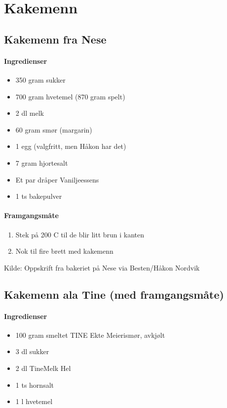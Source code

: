 \section{﻿Kakemenn}

\subsection{Kakemenn fra Nese}

\paragraph{Ingredienser}
\begin{itemize}[noitemsep]
	\item 350 gram sukker
	\item 700 gram hvetemel (870 gram spelt)
	\item 2 dl melk
	\item 60 gram smør (margarin)
	\item 1 egg (valgfritt, men Håkon har det)
	\item 7 gram hjortesalt
	\item Et par dråper Vaniljeessens
	\item 1 ts bakepulver
\end{itemize}

\paragraph{Framgangsmåte}
\begin{enumerate}[noitemsep]
	\item Stek på 200 \degree C til de blir litt brun i kanten
	\item Nok til fire brett med kakemenn
\end{enumerate}


Kilde: Oppskrift fra bakeriet på Nese via Besten/Håkon Nordvik


\subsection{Kakemenn ala Tine (med framgangsmåte)}

\paragraph{Ingredienser}
\begin{itemize}[noitemsep]
	\item 100 gram smeltet TINE Ekte Meierismør, avkjølt
	\item 3 dl sukker
	\item 2 dl TineMelk Hel
	\item 1 ts hornsalt
	\item 1 l hvetemel
\end{itemize}


